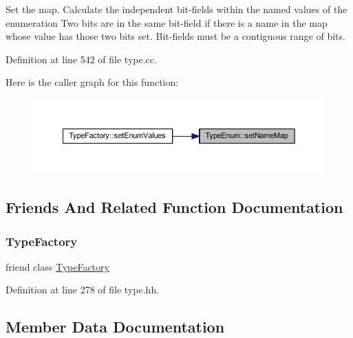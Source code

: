 Set the map. Calculate the independent bit-\/fields within the named values of the enumeration Two bits are in the same bit-\/field if there is a name in the map whose value has those two bits set. Bit-\/fields must be a contiguous range of bits. 

Definition at line 542 of file type.\+cc.

Here is the caller graph for this function\+:
\nopagebreak
\begin{figure}[H]
\begin{center}
\leavevmode
\includegraphics[width=350pt]{class_type_enum_a888839555ff7b768f371e794a979a8dc_icgraph}
\end{center}
\end{figure}


\subsection{Friends And Related Function Documentation}
\mbox{\label{class_type_enum_ac8c1945d0a63785e78b3e09a13226ed6}} 
\subsubsection{\texorpdfstring{TypeFactory}{TypeFactory}}
{\footnotesize\ttfamily friend class \mbox{\hyperlink{class_type_factory}{Type\+Factory}}\hspace{0.3cm}{\ttfamily [friend]}}



Definition at line 278 of file type.\+hh.



\subsection{Member Data Documentation}
\mbox{\label{class_type_enum_aeca741a62b9437eeff15ef7daa2a6bea}} 
